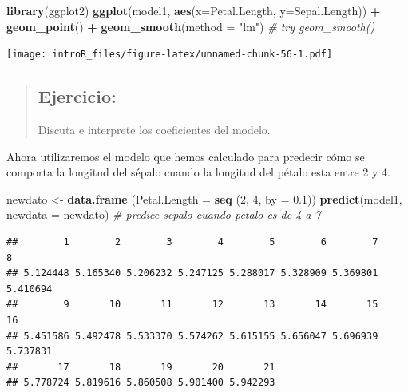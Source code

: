 \documentclass[
]{book}
\newenvironment{Shaded}{\begin{snugshade}}{\end{snugshade}}
\newcommand{\CommentTok}[1]{\textcolor[rgb]{0.56,0.35,0.01}{\textit{#1}}}
\newcommand{\DataTypeTok}[1]{\textcolor[rgb]{0.13,0.29,0.53}{#1}}
\newcommand{\DecValTok}[1]{\textcolor[rgb]{0.00,0.00,0.81}{#1}}
\newcommand{\FloatTok}[1]{\textcolor[rgb]{0.00,0.00,0.81}{#1}}
\newcommand{\KeywordTok}[1]{\textcolor[rgb]{0.13,0.29,0.53}{\textbf{#1}}}
\newcommand{\NormalTok}[1]{#1}
\newcommand{\OperatorTok}[1]{\textcolor[rgb]{0.81,0.36,0.00}{\textbf{#1}}}
\newcommand{\StringTok}[1]{\textcolor[rgb]{0.31,0.60,0.02}{#1}}
\begin{document}
\begin{Shaded}
\begin{Highlighting}[]
\KeywordTok{library}\NormalTok{(ggplot2)}
\KeywordTok{ggplot}\NormalTok{(model1, }\KeywordTok{aes}\NormalTok{(}\DataTypeTok{x=}\NormalTok{Petal.Length, }\DataTypeTok{y=}\NormalTok{Sepal.Length)) }\OperatorTok{+}\StringTok{ }\KeywordTok{geom_point}\NormalTok{() }\OperatorTok{+}\StringTok{ }
\StringTok{  }\KeywordTok{geom_smooth}\NormalTok{(}\DataTypeTok{method =} \StringTok{"lm"}\NormalTok{) }\CommentTok{# try geom_smooth()}
\end{Highlighting}
\end{Shaded}

\texttt{[image: introR\_files/figure-latex/unnamed-chunk-56-1.pdf]}

\begin{quote}
\hypertarget{ejercicio-3}{%
\subsection{Ejercicio:}\label{ejercicio-3}}

Discuta e interprete los coeficientes del modelo.
\end{quote}

Ahora utilizaremos el modelo que hemos calculado para predecir cómo se comporta la longitud del sépalo cuando la longitud del pétalo esta entre 2 y 4.

\begin{Shaded}
\begin{Highlighting}[]
\NormalTok{newdato <-}\StringTok{ }\KeywordTok{data.frame}\NormalTok{ (}\DataTypeTok{Petal.Length =} \KeywordTok{seq}\NormalTok{ (}\DecValTok{2}\NormalTok{, }\DecValTok{4}\NormalTok{, }\DataTypeTok{by =} \FloatTok{0.1}\NormalTok{))}
\KeywordTok{predict}\NormalTok{(model1, }\DataTypeTok{newdata =}\NormalTok{ newdato) }\CommentTok{# predice sepalo cuando petalo es de 4 a 7}
\end{Highlighting}
\end{Shaded}

\begin{verbatim}
##        1        2        3        4        5        6        7        8 
## 5.124448 5.165340 5.206232 5.247125 5.288017 5.328909 5.369801 5.410694 
##        9       10       11       12       13       14       15       16 
## 5.451586 5.492478 5.533370 5.574262 5.615155 5.656047 5.696939 5.737831 
##       17       18       19       20       21 
## 5.778724 5.819616 5.860508 5.901400 5.942293
\end{verbatim}
\end{document}
